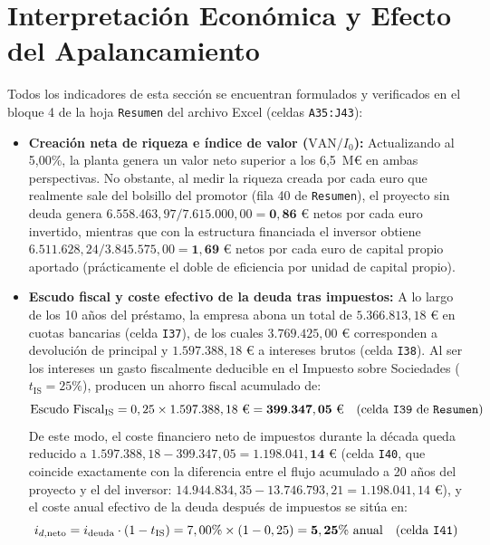 \documentclass[a4paper,11pt]{report}
\providecommand{\euro}{€}
\begin{document}
\section{Interpretación Económica y Efecto del Apalancamiento}
Todos los indicadores de esta sección se encuentran formulados y verificados en el bloque 4 de la hoja \texttt{Resumen} del archivo Excel (celdas \texttt{A35:J43}):
\begin{itemize}
    \item \textbf{Creación neta de riqueza e índice de valor ($\text{VAN}/I_0$):} Actualizando al 5,00\%, la planta genera un valor neto superior a los 6,5~M\euro{} en ambas perspectivas. No obstante, al medir la riqueza creada por cada euro que realmente sale del bolsillo del promotor (fila 40 de \texttt{Resumen}), el proyecto sin deuda genera $6.558.463,97 / 7.615.000,00 = \mathbf{0,86\text{ \euro}}$ netos por cada euro invertido, mientras que con la estructura financiada el inversor obtiene $6.511.628,24 / 3.845.575,00 = \mathbf{1,69\text{ \euro}}$ netos por cada euro de capital propio aportado (prácticamente el doble de eficiencia por unidad de capital propio).
    \item \textbf{Escudo fiscal y coste efectivo de la deuda tras impuestos:} A lo largo de los 10 años del préstamo, la empresa abona un total de $5.366.813,18\text{ \euro}$ en cuotas bancarias (celda \texttt{I37}), de los cuales $3.769.425,00\text{ \euro}$ corresponden a devolución de principal y $1.597.388,18\text{ \euro}$ a intereses brutos (celda \texttt{I38}). Al ser los intereses un gasto fiscalmente deducible en el Impuesto sobre Sociedades ($t_{\text{IS}} = 25\%$), producen un ahorro fiscal acumulado de:
    \begin{equation}
        \text{Escudo Fiscal}_{\text{IS}} = 0,25 \times 1.597.388,18\text{ \euro} = \mathbf{399.347,05\text{ \euro}} \quad (\text{celda \texttt{I39} de \texttt{Resumen}})
    \end{equation}
    De este modo, el coste financiero neto de impuestos durante la década queda reducido a $1.597.388,18 - 399.347,05 = \mathbf{1.198.041,14\text{ \euro}}$ (celda \texttt{I40}, que coincide exactamente con la diferencia entre el flujo acumulado a 20 años del proyecto y el del inversor: $14.944.834,35 - 13.746.793,21 = 1.198.041,14\text{ \euro}$), y el coste anual efectivo de la deuda después de impuestos se sitúa en:
    \begin{equation}
        i_{d,\text{neto}} = i_{\text{deuda}} \cdot (1 - t_{\text{IS}}) = 7,00\% \times (1 - 0,25) = \mathbf{5,25\%\text{ anual}} \quad (\text{celda \texttt{I41}})

\end{equation}
\end{itemize}
\end{document}
